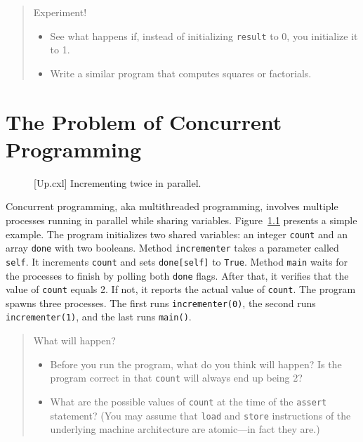 \documentclass{report}
\newenvironment{code}{
\tcolorbox
}{
\endtcolorbox
}
\begin{document}
\begin{quote}
Experiment!
\begin{itemize}
\item See what happens if, instead of initializing \texttt{result} to 0,
you initialize it to 1.
\item Write a similar program that computes squares or factorials.
\end{itemize}
\end{quote}

\chapter{The Problem of Concurrent Programming}

\begin{figure}
\begin{code}
\end{code}
\caption{[Up.cxl] Incrementing twice in parallel.}
\label{fig:inc}
\end{figure}

Concurrent programming, aka multithreaded programming, involves multiple
processes running in parallel while sharing variables.
Figure~\ref{fig:inc} presents a simple example.
The program
initializes two shared variables: an integer \texttt{count} and
an array \texttt{done} with two booleans.
Method \texttt{incrementer} takes a parameter called \texttt{self}.
It increments \texttt{count} and sets \texttt{done[self]} to \texttt{True}.
Method \texttt{main} waits for the processes to finish by polling
both \texttt{done} flags.
After that, it verifies that the value of \texttt{count} equals 2.  If not,
it reports the actual value of \texttt{count}.
The program spawns three processes.
The first runs \texttt{incrementer(0)}, the second runs
\texttt{incrementer(1)}, and the last runs \texttt{main()}.

\begin{quote}
What will happen?
\begin{itemize}
\item Before you run the program, what do you think will happen?  Is the
program correct in that \texttt{count} will always end up being 2?
\item What are the possible values of \texttt{count} at the time of the
\texttt{assert} statement?
(You may assume that \texttt{load} and \texttt{store} instructions of the
underlying machine architecture are atomic---in fact they are.)
\end{itemize}
\end{quote}
\end{document}
